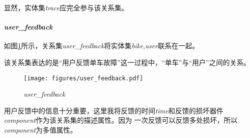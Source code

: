 显然，实体集\textit{trace}应完全参与该关系集。
\paragraph{\textit{user\_feedback}}
如图\ref{fig:feedback}所示，关系集\textit{user\_feedback}将实体集\textit{bike,user}联系在一起。

该关系集表达的是“用户反馈单车故障”这一过程中，“单车”与“用户”之间的关系。

\begin{figure}[htbp]
  \centering
  \texttt{[image: figures/user\_feedback.pdf]}
  \caption{\textit{user\_feedback}}
  \label{fig:feedback}
\end{figure}

用户反馈中的信息十分重要，这里我将反馈的时间\textit{time}和反馈的损坏器件\textit{component}作为该关系集的描述属性。因为
一次反馈可以反馈多处损坏，所以\textit{component}为多值属性。